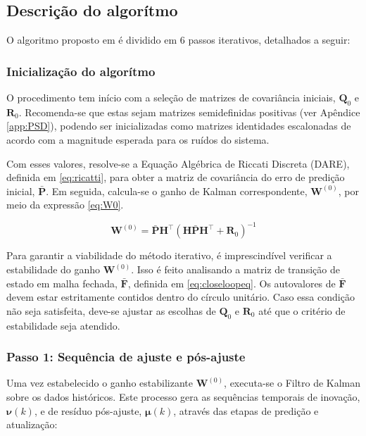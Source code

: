 \documentclass[journal]{IEEEtran}
\begin{document}
\subsection{Descrição do algorítmo}
\label{sec:descAlg}
O algoritmo proposto em \cite{zhang2020} é dividido em 6 passos iterativos, detalhados a seguir:

\subsubsection{\textbf{Inicialização do algorítmo}}

O procedimento tem início com a seleção de matrizes de covariância iniciais, $\mathbf{Q}_0$ e $\mathbf{R}_0$. Recomenda-se que estas sejam matrizes semidefinidas positivas (ver Apêndice \ref{app:PSD}), podendo ser inicializadas como matrizes identidades escalonadas de acordo com a magnitude esperada para os ruídos do sistema.

Com esses valores, resolve-se a Equação Algébrica de Riccati Discreta (DARE), definida em \eqref{eq:ricatti}, para obter a matriz de covariância do erro de predição inicial, $\bar{\mathbf{P}}$. Em seguida, calcula-se o ganho de Kalman correspondente, $\mathbf{W}^{(0)}$, por meio da expressão \ref{eq:W0}.

\begin{equation}
    \label{eq:W0}
    \mathbf{W}^{(0)} = \bar{\mathbf{P}}\mathbf{H}^\top \left( \mathbf{H}\bar{\mathbf{P}}\mathbf{H}^\top + \mathbf{R}_0 \right)^{-1}
\end{equation}

Para garantir a viabilidade do método iterativo, é imprescindível verificar a estabilidade do ganho $\mathbf{W}^{(0)}$. Isso é feito analisando a matriz de transição de estado em malha fechada, $\bar{\mathbf{F}}$, definida em \eqref{eq:closeloopeq}. Os autovalores de $\bar{\mathbf{F}}$ devem estar estritamente contidos dentro do círculo unitário. Caso essa condição não seja satisfeita, deve-se ajustar as escolhas de $\mathbf{Q}_0$ e $\mathbf{R}_0$ até que o critério de estabilidade seja atendido.

\subsubsection{\textbf{Passo 1: Sequência de ajuste e pós-ajuste}}

Uma vez estabelecido o ganho estabilizante $\mathbf{W}^{(0)}$, executa-se o Filtro de Kalman sobre os dados históricos. Este processo gera as sequências temporais de inovação, $\boldsymbol{\nu}(k)$, e de resíduo pós-ajuste, $\boldsymbol{\mu}(k)$, através das etapas de predição e atualização:
\end{document}
